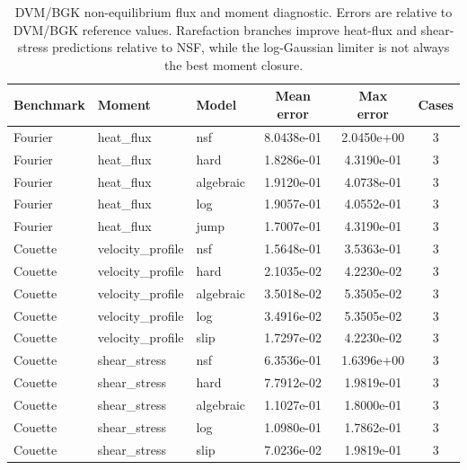 \begin{table}[t]
\centering
\caption{DVM/BGK non-equilibrium flux and moment diagnostic. Errors are relative to DVM/BGK reference values. Rarefaction branches improve heat-flux and shear-stress predictions relative to NSF, while the log-Gaussian limiter is not always the best moment closure.}
\label{tab:flux_moment_validation}
\begin{tabular}{lllccc}
\toprule
Benchmark & Moment & Model & Mean error & Max error & Cases \\
\midrule
Fourier & heat\_flux & nsf & 8.0438e-01 & 2.0450e+00 & 3 \\
Fourier & heat\_flux & hard & 1.8286e-01 & 4.3190e-01 & 3 \\
Fourier & heat\_flux & algebraic & 1.9120e-01 & 4.0738e-01 & 3 \\
Fourier & heat\_flux & log & 1.9057e-01 & 4.0552e-01 & 3 \\
Fourier & heat\_flux & jump & 1.7007e-01 & 4.3190e-01 & 3 \\
Couette & velocity\_profile & nsf & 1.5648e-01 & 3.5363e-01 & 3 \\
Couette & velocity\_profile & hard & 2.1035e-02 & 4.2230e-02 & 3 \\
Couette & velocity\_profile & algebraic & 3.5018e-02 & 5.3505e-02 & 3 \\
Couette & velocity\_profile & log & 3.4916e-02 & 5.3505e-02 & 3 \\
Couette & velocity\_profile & slip & 1.7297e-02 & 4.2230e-02 & 3 \\
Couette & shear\_stress & nsf & 6.3536e-01 & 1.6396e+00 & 3 \\
Couette & shear\_stress & hard & 7.7912e-02 & 1.9819e-01 & 3 \\
Couette & shear\_stress & algebraic & 1.1027e-01 & 1.8000e-01 & 3 \\
Couette & shear\_stress & log & 1.0980e-01 & 1.7862e-01 & 3 \\
Couette & shear\_stress & slip & 7.0236e-02 & 1.9819e-01 & 3 \\
\bottomrule
\end{tabular}
\end{table}
